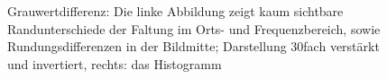 \documentclass[a4paper,12pt]{article}
\begin{document}
  

\begin{figure}[htbp]
\caption{Grauwertdifferenz: Die linke Abbildung zeigt kaum sichtbare
Randunterschiede der Faltung im Orts- und Frequenzbereich, sowie Rundungsdifferenzen
in der Bildmitte; Darstellung 30fach verstärkt und
invertiert, rechts: das Histogramm}%
\label{figure_border_convolve}
\end{figure}

\end{document}
